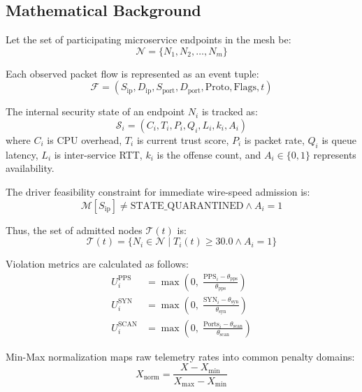 \documentclass[conference]{IEEEtran}
\begin{document}
\subsection{Mathematical Background}
Let the set of participating microservice endpoints in the mesh be:
\begin{equation}
\mathcal{N} = \{N_1, N_2, \dots, N_m\} \label{eq:nodes}
\end{equation}

Each observed packet flow is represented as an event tuple:
\begin{equation}
\mathcal{F} = (S_{\text{ip}}, D_{\text{ip}}, S_{\text{port}}, D_{\text{port}}, \text{Proto}, \text{Flags}, t) \label{eq:flow}
\end{equation}

The internal security state of an endpoint $N_i$ is tracked as:
\begin{equation}
\mathcal{S}_i = (C_i, T_i, P_i, Q_i, L_i, k_i, A_i) \label{eq:state}
\end{equation}
where $C_i$ is CPU overhead, $T_i$ is current trust score, $P_i$ is packet rate, $Q_i$ is queue latency, $L_i$ is inter-service RTT, $k_i$ is the offense count, and $A_i \in \{0, 1\}$ represents availability.

The driver feasibility constraint for immediate wire-speed admission is:
\begin{equation}
\mathcal{M}[S_{\text{ip}}] \neq \text{STATE\_QUARANTINED} \land A_i = 1 \label{eq:constraint}
\end{equation}

Thus, the set of admitted nodes $\mathcal{T}(t)$ is:
\begin{equation}
\mathcal{T}(t) = \{N_i \in \mathcal{N} \mid T_i(t) \ge 30.0 \land A_i = 1\} \label{eq:admitted}
\end{equation}

Violation metrics are calculated as follows:
\begin{align}
U_i^{\text{PPS}}  &= \max\left(0, \;\frac{\text{PPS}_i - \theta_{\text{pps}}}{\theta_{\text{pps}}}\right) \label{eq:u_pps} \\
U_i^{\text{SYN}}  &= \max\left(0, \;\frac{\text{SYN}_i - \theta_{\text{syn}}}{\theta_{\text{syn}}}\right) \label{eq:u_syn} \\
U_i^{\text{SCAN}} &= \max\left(0, \;\frac{\text{Ports}_i - \theta_{\text{scan}}}{\theta_{\text{scan}}}\right) \label{eq:u_scan}
\end{align}

Min-Max normalization maps raw telemetry rates into common penalty domains:
\begin{equation}
X_{\text{norm}} = \frac{X - X_{\text{min}}}{X_{\text{max}} - X_{\text{min}}} \label{eq:norm}
\end{equation}
\end{document}
